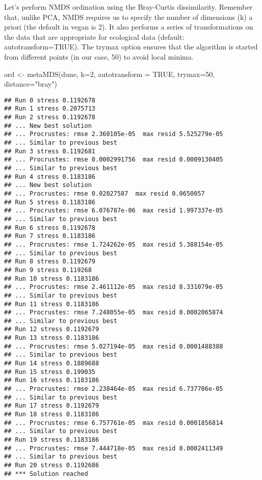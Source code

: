 \documentclass[
]{book}
\newenvironment{Shaded}{\begin{snugshade}}{\end{snugshade}}
\newcommand{\AttributeTok}[1]{\textcolor[rgb]{0.77,0.63,0.00}{#1}}
\newcommand{\ConstantTok}[1]{\textcolor[rgb]{0.00,0.00,0.00}{#1}}
\newcommand{\DecValTok}[1]{\textcolor[rgb]{0.00,0.00,0.81}{#1}}
\newcommand{\FunctionTok}[1]{\textcolor[rgb]{0.00,0.00,0.00}{#1}}
\newcommand{\NormalTok}[1]{#1}
\newcommand{\OtherTok}[1]{\textcolor[rgb]{0.56,0.35,0.01}{#1}}
\newcommand{\StringTok}[1]{\textcolor[rgb]{0.31,0.60,0.02}{#1}}
\begin{document}
Let's perform NMDS ordination using the Bray-Curtis dissimilarity. Remember that, unlike PCA, NMDS requires us to specify the number of dimensions (k) a priori (the default in vegan is 2). It also performs a series of transformations on the data that are appropriate for ecological data (default: autotransform=TRUE). The trymax option ensures that the algorithm is started from different points (in our case, 50) to avoid local minima.

\begin{Shaded}
\begin{Highlighting}[]
\NormalTok{ord }\OtherTok{\textless{}{-}} \FunctionTok{metaMDS}\NormalTok{(dune, }\AttributeTok{k=}\DecValTok{2}\NormalTok{, }\AttributeTok{autotransform =} \ConstantTok{TRUE}\NormalTok{, }\AttributeTok{trymax=}\DecValTok{50}\NormalTok{, }\AttributeTok{distance=}\StringTok{"bray"}\NormalTok{)}
\end{Highlighting}
\end{Shaded}

\begin{verbatim}
## Run 0 stress 0.1192678 
## Run 1 stress 0.2075713 
## Run 2 stress 0.1192678 
## ... New best solution
## ... Procrustes: rmse 2.360105e-05  max resid 5.525279e-05 
## ... Similar to previous best
## Run 3 stress 0.1192681 
## ... Procrustes: rmse 0.0002991756  max resid 0.0009130405 
## ... Similar to previous best
## Run 4 stress 0.1183186 
## ... New best solution
## ... Procrustes: rmse 0.02027587  max resid 0.0650057 
## Run 5 stress 0.1183186 
## ... Procrustes: rmse 6.076787e-06  max resid 1.997337e-05 
## ... Similar to previous best
## Run 6 stress 0.1192678 
## Run 7 stress 0.1183186 
## ... Procrustes: rmse 1.724262e-05  max resid 5.388154e-05 
## ... Similar to previous best
## Run 8 stress 0.1192679 
## Run 9 stress 0.119268 
## Run 10 stress 0.1183186 
## ... Procrustes: rmse 2.461112e-05  max resid 8.331079e-05 
## ... Similar to previous best
## Run 11 stress 0.1183186 
## ... Procrustes: rmse 7.248055e-05  max resid 0.0002065874 
## ... Similar to previous best
## Run 12 stress 0.1192679 
## Run 13 stress 0.1183186 
## ... Procrustes: rmse 5.027194e-05  max resid 0.0001488388 
## ... Similar to previous best
## Run 14 stress 0.1889688 
## Run 15 stress 0.199035 
## Run 16 stress 0.1183186 
## ... Procrustes: rmse 2.238464e-05  max resid 6.737706e-05 
## ... Similar to previous best
## Run 17 stress 0.1192679 
## Run 18 stress 0.1183186 
## ... Procrustes: rmse 6.757761e-05  max resid 0.0001856814 
## ... Similar to previous best
## Run 19 stress 0.1183186 
## ... Procrustes: rmse 7.444718e-05  max resid 0.0002411349 
## ... Similar to previous best
## Run 20 stress 0.1192686 
## *** Solution reached
\end{verbatim}
\end{document}
